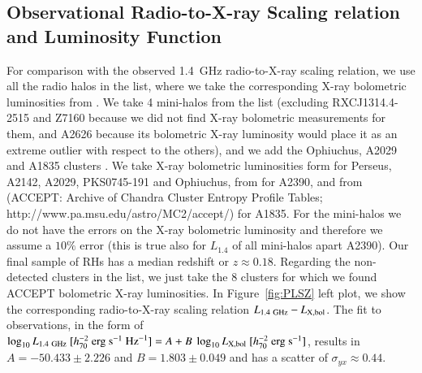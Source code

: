 \documentclass[traditabstract]{aa}
\newcommand{\rmn}{\mathrm}
\begin{document}
\begin{appendix}
\section{Observational Radio-to-X-ray Scaling relation and Luminosity Function}
\label{app:D}

For comparison with the observed 1.4~GHz radio-to-X-ray scaling relation, we use all the radio halos in the \cite{2011A&A...527A..99E} list, where we take the corresponding X-ray bolometric luminosities from \cite{2009A&A...507..661B}. We take 4 mini-halos from the \cite{2011A&A...527A..99E} list (excluding RXCJ1314.4-2515 and Z7160 because we did not find X-ray bolometric measurements for them, and A2626 because its bolometric X-ray luminosity would place it as an extreme outlier with respect to the others), and we add the Ophiuchus, A2029 and A1835 clusters \citep{2009A&A...499..371G}. We take X-ray bolometric luminosities form \cite{2002ApJ...567..716R} for Perseus, A2142, A2029,  PKS0745-191 and Ophiuchus, from \cite{Boehringer:1998vv} for A2390, and from \cite{2009ApJS..182...12C} (ACCEPT: Archive of Chandra Cluster Entropy Profile Tables; http://www.pa.msu.edu/astro/MC2/accept/) for A1835. For the mini-halos we do not have the errors on the X-ray bolometric luminosity and therefore we assume a $10\%$ error (this is true also for $L_{1.4}$ of all mini-halos apart A2390). Our final sample of RHs has a median redshift or $z\approx0.18$. Regarding the non-detected clusters in the \cite{2011A&A...527A..99E} list, we just take the 8 clusters for which we found ACCEPT bolometric X-ray luminosities. In Figure~\ref{fig:PLSZ} left plot, we show the corresponding radio-to-X-ray scaling relation $L_{1.4~\rm{GHz}}-L_{\rm{X,bol}}$. The fit to observations, in the form of $\log_{10} L_{1.4~\rmn{GHz}}~[h_{70}^{-2}~\rmn{erg}~\rmn{s}^{-1}~\rmn{Hz}^{-1}] = A + B~\log_{10} L_{ \rm{X,bol}}~[h_{70}^{-2}~\rmn{erg}~\rmn{s}^{-1}]$, results in $A=-50.433\pm2.226$ and $B=1.803\pm0.049$ and has a scatter of $\sigma_{yx} \approx 0.44$. 


\end{appendix}
\end{document}
